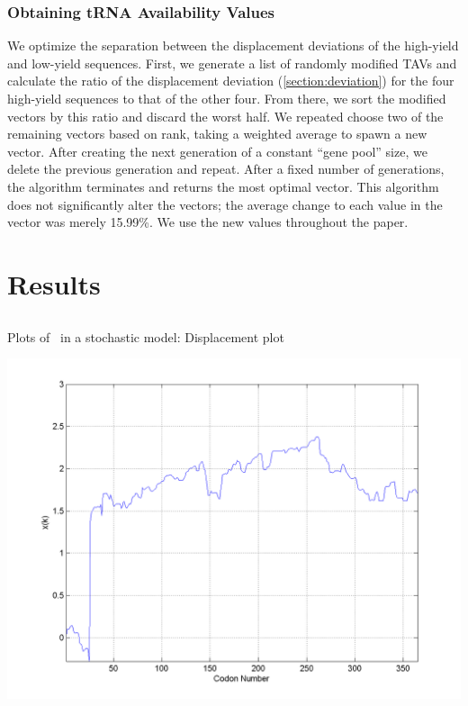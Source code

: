 \documentclass[twocolumn]{article}
\begin{document}
\subsubsection{Obtaining tRNA Availability Values}
We optimize the separation between the displacement deviations of the 
high-yield and low-yield sequences. First, we generate a list of 
randomly modified TAVs and calculate the ratio of the 
displacement deviation (\autoref{section:deviation}) for the four 
high-yield sequences to that of the other four. From there, we sort the 
modified vectors by this ratio and discard the worst half.
We repeated choose two of the remaining vectors based on rank, taking a weighted 
average to spawn a new vector.  After creating the 
next generation of a constant ``gene pool'' size, we delete 
the previous generation and repeat. After a fixed number of 
generations, the algorithm terminates and returns the most optimal vector.
This algorithm does not significantly alter the vectors; the average 
change to each value in the vector was merely 15.99\%. We use the new values
throughout the paper.

\section{Results}
\subsection{\prfB}

\begin{cfigure}
  \caption{Plots of \prfB\ in a stochastic model: Displacement plot}
  \label{prfB:disp:sub}
  \includegraphics[width=\linewidth]{prfB/disp}
\end{cfigure}
\end{document}
